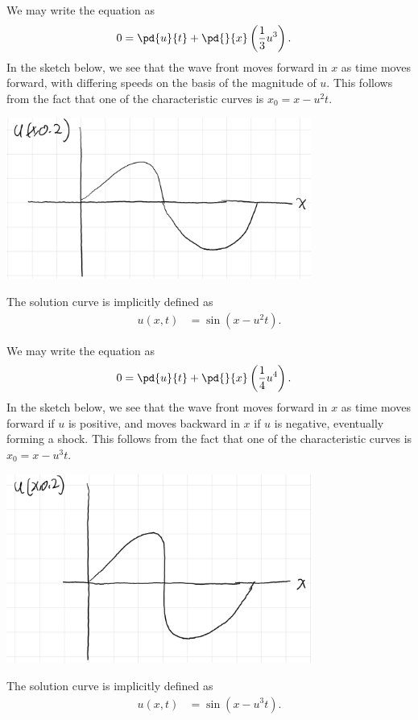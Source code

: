\documentclass[10pt]{mypackage}
\begin{document}
\begin{solution}
  We may write the equation as
  \begin{align*}
    0 &= \pd{u}{t} + \pd{}{x}\left( \frac{1}{3}u^3 \right).
  \end{align*}
  In the sketch below, we see that the wave front moves forward in $x$ as time moves forward, with differing speeds on the basis of the magnitude of $u$. This follows from the fact that one of the characteristic curves is $x_0 = x- u^2 t$.
  \begin{center}
    \includegraphics[width=10cm]{images/hw_9_solution_curve_1.png}
  \end{center}
  The solution curve is implicitly defined as
  \begin{align*}
    u\left( x,t \right) &= \sin\left( x-u^2 t \right).
  \end{align*}
\end{solution}
\begin{solution}
  We may write the equation as
  \begin{align*}
    0 &= \pd{u}{t} + \pd{}{x}\left( \frac{1}{4}u^4 \right).
  \end{align*}
  In the sketch below, we see that the wave front moves forward in $x$ as time moves forward if $u$ is positive, and moves backward in $x$ if $u$ is negative, eventually forming a shock. This follows from the fact that one of the characteristic curves is $x_0 = x-u^3 t$.
  \begin{center}
    \includegraphics[width=10cm]{images/hw_9_solution_curve_2.png}
  \end{center}
  The solution curve is implicitly defined as
  \begin{align*}
    u\left( x,t \right) &= \sin\left( x-u^3 t \right).
  \end{align*}
  
\end{solution}
\end{document}
